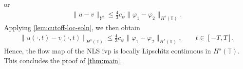 \documentclass[12pt,reqno]{amsart}
\numberwithin{equation}{section}  %
\numberwithin{figure}{section}
\newcommand{\ci}{\mathbb{T}}
\newcommand{\p}{\partial}
\newcommand{\vp}{\varphi}
\theoremstyle{plain}
\theoremstyle{definition}
\theoremstyle{remark}
\begin{document}
%
%
or
%
%
\begin{equation*}
	\begin{split}
		\|u -v \|_{Y^s} \le \frac{4}{3} c_\psi \|\vp_1 - \vp_2 \|_{H^{s}(\ci)}.
	\end{split}
\end{equation*}
%
%
Applying \autoref{lem:cutoff-loc-soln}, we then obtain
%
%
	 \begin{equation*}
		 \begin{split}
			\|u(\cdot, t) -v(\cdot, t) \|_{H^s(\ci)} \le \frac{4}{3} c_\psi \|\vp_1 -
			\vp_2 \|_{H^{s}(\ci)}, \qquad t \in [-T, T].
		 \end{split}
	 \end{equation*}
Hence, the flow map of the NLS ivp is locally Lipschitz continuous in
$H^s(\ci)$. This
concludes the proof of \autoref{thm:main}. \qquad \qedsymbol
%
%
%
\end{document}
